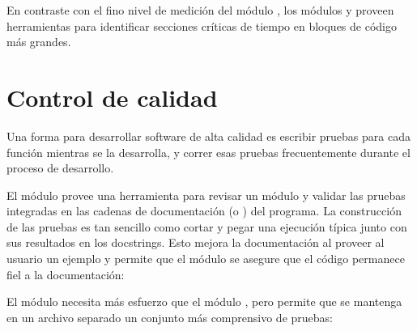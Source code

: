 \documentclass[a5paper,10pt,spanish]{sphinxmanual}
\begin{document}
\sphinxAtStartPar
En contraste con el fino nivel de medición del módulo , los módulos  y  proveen herramientas para identificar secciones críticas de tiempo en bloques de código más grandes.


\section{Control de calidad}
\label{\detokenize{tutorial/stdlib:quality-control}}\label{\detokenize{tutorial/stdlib:tut-quality-control}}
\sphinxAtStartPar
Una forma para desarrollar software de alta calidad es escribir pruebas para cada función mientras se la desarrolla, y correr esas pruebas frecuentemente durante el proceso de desarrollo.

\sphinxAtStartPar
El módulo  provee una herramienta para revisar un módulo y validar las pruebas integradas en las cadenas de documentación (o ) del programa.  La construcción de las pruebas es tan sencillo como cortar y pegar una ejecución típica junto con sus resultados en los docstrings.  Esto mejora la documentación al proveer al usuario un ejemplo y permite que el módulo  se asegure que el código permanece fiel a la documentación:

\begin{sphinxVerbatim}[commandchars=\\\{\}]
 

       

 
   
\end{sphinxVerbatim}

\sphinxAtStartPar
El módulo  necesita más esfuerzo que el módulo , pero permite que se mantenga en un archivo separado un conjunto más comprensivo de pruebas:
\end{document}
